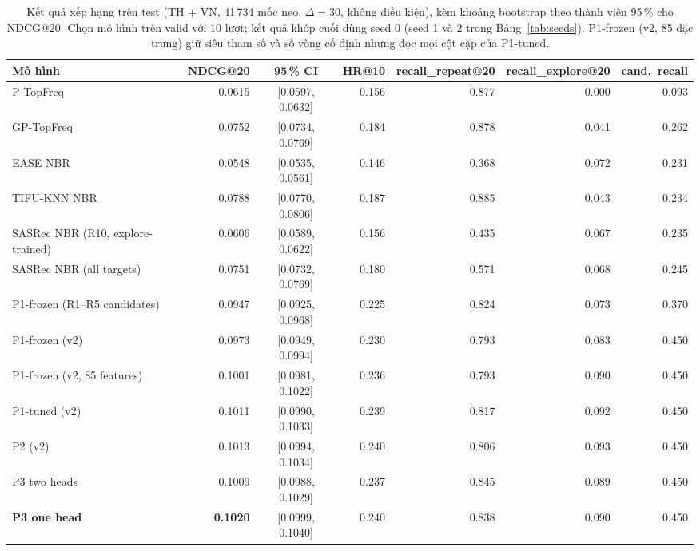 \documentclass[jtehm]{ieeeaccess}
\begin{document}
\begin{table}[t]
\caption{Kết quả xếp hạng trên test (TH + VN, 41\,734 mốc neo, $\Delta = 30$, không điều kiện), kèm khoảng bootstrap theo thành viên 95\,\% cho NDCG@20. Chọn mô hình trên valid với 10 lượt; kết quả khớp cuối dùng seed 0 (seed 1 và 2 trong Bảng~\ref{tab:seeds}). P1-frozen (v2, 85 đặc trưng) giữ siêu tham số và số vòng cố định nhưng đọc mọi cột cặp của P1-tuned.}
\label{tab:t31}
\centering
\begin{tabular}{lrcrrrr}
\toprule
Mô hình & NDCG@20 & 95\,\% CI & HR@10 & recall\_repeat@20 & recall\_explore@20 & cand.\ recall \\
\midrule
P-TopFreq                 & 0.0615 & [0.0597, 0.0632] & 0.156 & 0.877 & 0.000 & 0.093 \\
GP-TopFreq                & 0.0752 & [0.0734, 0.0769] & 0.184 & 0.878 & 0.041 & 0.262 \\
EASE NBR                  & 0.0548 & [0.0535, 0.0561] & 0.146 & 0.368 & 0.072 & 0.231 \\
TIFU-KNN NBR              & 0.0788 & [0.0770, 0.0806] & 0.187 & 0.885 & 0.043 & 0.234 \\
SASRec NBR (R10, explore-trained) & 0.0606 & [0.0589, 0.0622] & 0.156 & 0.435 & 0.067 & 0.235 \\
SASRec NBR (all targets)  & 0.0751 & [0.0732, 0.0769] & 0.180 & 0.571 & 0.068 & 0.245 \\
\midrule
P1-frozen (R1--R5 candidates) & 0.0947 & [0.0925, 0.0968] & 0.225 & 0.824 & 0.073 & 0.370 \\
P1-frozen (v2)            & 0.0973 & [0.0949, 0.0994] & 0.230 & 0.793 & 0.083 & 0.450 \\
P1-frozen (v2, 85 features) & 0.1001 & [0.0981, 0.1022] & 0.236 & 0.793 & 0.090 & 0.450 \\
P1-tuned (v2)             & 0.1011 & [0.0990, 0.1033] & 0.239 & 0.817 & 0.092 & 0.450 \\
P2 (v2)                   & 0.1013 & [0.0994, 0.1034] & 0.240 & 0.806 & 0.093 & 0.450 \\
P3 two heads              & 0.1009 & [0.0988, 0.1029] & 0.237 & 0.845 & 0.089 & 0.450 \\
\textbf{P3 one head}      & \textbf{0.1020} & [0.0999, 0.1040] & 0.240 & 0.838 & 0.090 & 0.450 \\
\bottomrule
\end{tabular}
\end{table}
\end{document}
